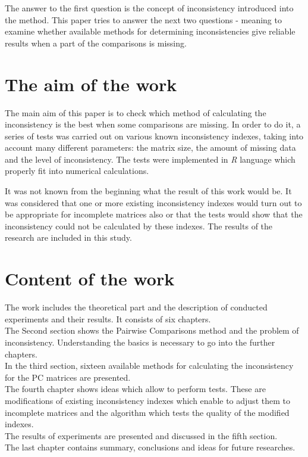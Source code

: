 The answer to the first question is the concept of inconsistency introduced into the method. This paper tries to answer the next two questions - meaning to examine whether available methods for determining inconsistencies give reliable results when a part of the comparisons is missing. 

\section{The aim of the work}
\label{sec:celePracy}
The main aim of this paper is to check which method of calculating the inconsistency is the best when some comparisons are missing. In order to do it, a series of tests was carried out on various known inconsistency indexes, taking into account many different parameters: the matrix size, the amount of missing data and the level of inconsistency.
The tests were implemented in \textit{R} language which properly fit into numerical calculations.

It was not known from the beginning what the result of this work would be. It was considered that one or more existing inconsistency indexes would turn out to be appropriate for incomplete matrices also or that the tests would show that the inconsistency could not be calculated by these indexes. 
The results of the research are included in this study.

\section{Content of the work}
\label{sec:zawartoscPracy}
The work includes the theoretical part and the description of conducted experiments and their results. It consists of six chapters.\\
The Second section shows the Pairwise Comparisons method and the problem of inconsistency. Understanding the basics is necessary to go into the further chapters.\\
In the third section, sixteen available methods for calculating the inconsistency for the PC matrices are presented. \\
The fourth chapter shows ideas which allow to perform tests. These are modifications of existing inconsistency indexes which enable to adjust them to incomplete matrices and the algorithm which tests the quality of the modified indexes. \\
The results of experiments are presented and discussed in the fifth section.\\
The last chapter contains summary, conclusions and ideas for future researches.